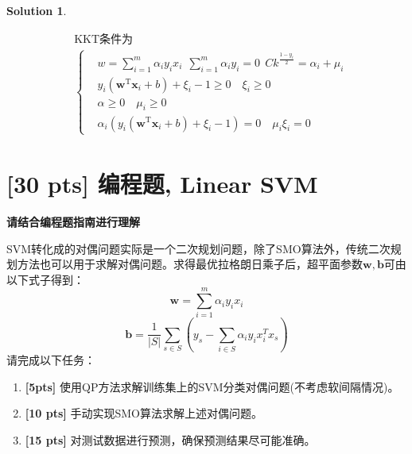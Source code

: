 \documentclass[a4paper,UTF8]{article}
\theoremstyle{definition}
\newtheorem*{solution}{Solution}
\begin{document}
\begin{solution}
\begin{enumerate}[(1)]
\begin{equation*}
\begin{split}
		&\text{KKT条件为}\\
		&\left\{
		\begin{aligned}
		&w= \sum_{i=1}^m\alpha_i y_i x_i\ \ \sum_{i=1}^m \alpha_i y_i = 0\ \ C k^{\frac{1-y_i}{2}} = \alpha_i + \mu_i \\
		&y_i(\mathbf{w}^\mathrm{T}\mathbf{x}_i + b)+\xi_i -1 \ge 0 \quad \xi_i \geq 0\\
		&\alpha \ge 0 \quad \mu_i \ge 0\\
		&\alpha_i(y_i(\mathbf{w}^\mathrm{T}\mathbf{x}_i + b)+\xi_i -1) = 0 \quad \mu_i \xi_i = 0
		\end{aligned}
		\right.
	\end{split}
	\end{equation*}
\end{enumerate}
\end{solution}

\section{[30 pts] 编程题, Linear SVM}
\textbf{请结合编程题指南进行理解}

SVM转化成的对偶问题实际是一个二次规划问题，除了SMO算法外，传统二次规划方法也可以用于求解对偶问题。求得最优拉格朗日乘子后，超平面参数$\mathbf{w,b}$可由以下式子得到：
\begin{equation}
\mathbf{w} = \sum_{i=1}^m \alpha_i y_i x_i
\end{equation}
\begin{equation}
\mathbf{b} = \frac{1}{|S|}\sum_{s\in S} (y_s-\sum_{i\in S}\alpha_i y_i x_i^T x_s)
\end{equation}
请完成以下任务：
\begin{enumerate}[(1)]
	\item \textbf{[5pts]} 使用QP方法求解训练集上的SVM分类对偶问题(不考虑软间隔情况)。
	\item \textbf{[10 pts]} 手动实现SMO算法求解上述对偶问题。
	\item \textbf{[15 pts]} 对测试数据进行预测，确保预测结果尽可能准确。
\end{enumerate}
\end{document}
